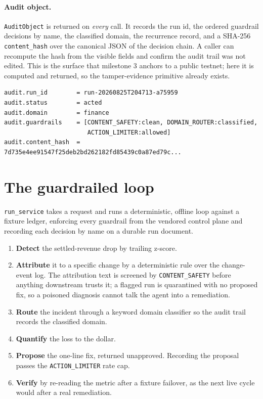 \documentclass[11pt]{article}
\begin{document}
\paragraph{Audit object.} \texttt{AuditObject} is returned on \emph{every} call.
It records the run id, the ordered guardrail decisions by name, the classified
domain, the recurrence record, and a SHA-256 \texttt{content\_hash} over the
canonical JSON of the decision chain. A caller can recompute the hash from the
visible fields and confirm the audit trail was not edited. This is the surface
that milestone 3 anchors to a public testnet; here it is computed and returned,
so the tamper-evidence primitive already exists.

\begin{lstlisting}
audit.run_id        = run-20260825T204713-a75959
audit.status        = acted
audit.domain        = finance
audit.guardrails    = [CONTENT_SAFETY:clean, DOMAIN_ROUTER:classified,
                       ACTION_LIMITER:allowed]
audit.content_hash  = 7d735e4ee91547f25deb2bd262182fd85439c0a87ed79c...
\end{lstlisting}

\section{The guardrailed loop}

\texttt{run\_service} takes a request and runs a deterministic, offline loop
against a fixture ledger, enforcing every guardrail from the vendored control
plane and recording each decision by name on a durable run document.

\begin{enumerate}[leftmargin=1.4em, itemsep=1pt]
  \item \textbf{Detect} the settled-revenue drop by trailing z-score.
  \item \textbf{Attribute} it to a specific change by a deterministic rule over
        the change-event log. The attribution text is screened by
        \texttt{CONTENT\_SAFETY} before anything downstream trusts it; a flagged
        run is quarantined with no proposed fix, so a poisoned diagnosis cannot
        talk the agent into a remediation.
  \item \textbf{Route} the incident through a keyword domain classifier so the
        audit trail records the classified domain.
  \item \textbf{Quantify} the loss to the dollar.
  \item \textbf{Propose} the one-line fix, returned unapproved. Recording the
        proposal passes the \texttt{ACTION\_LIMITER} rate cap.
  \item \textbf{Verify} by re-reading the metric after a fixture failover, as the
        next live cycle would after a real remediation.
\end{enumerate}
\end{document}
